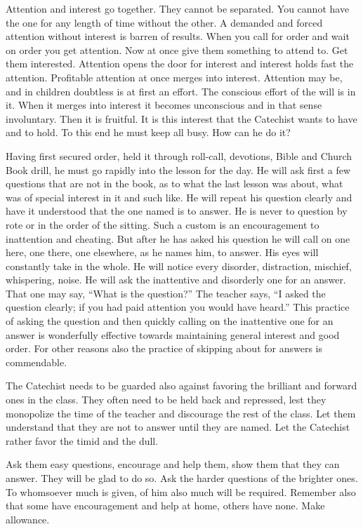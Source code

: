 Attention and interest go together. They cannot be separated. You cannot have the one for any length of time without the other. A demanded and forced attention without interest is barren of results. When you call for order and wait on order you get attention. Now at once give them something to attend to. Get them interested. Attention opens the door
for interest and interest holds fast the attention. Profitable attention at once merges into interest. Attention may be, and in children doubtless is at first an effort. The conscious effort of the will is in it. When it merges into interest it becomes unconscious and in that sense involuntary. Then it is fruitful. It is this interest that the Catechist wants to have and to hold. To this end he must keep all busy. How can he do it?

Having first secured order, held it through roll-call, devotions, Bible and Church Book drill, he must go rapidly into the lesson for the day. He will ask first a few questions that are not in the book, as to what the last lesson was about, what was of special interest in it and such like. He will repeat his question clearly and have it understood that the one named is to answer. He is never to question by rote or in the order of the sitting. Such a custom is an encouragement to inattention and cheating. But after he has asked his question he will call on one here, one there, one elsewhere, as he names him, to answer. His eyes will constantly take in the whole. He will notice every disorder, distraction, mischief, whispering, noise. He will ask the inattentive and disorderly one for an answer. That one may say, “What is the question?” The teacher says, “I asked the question clearly; if you had paid attention you would have heard.” This practice of asking the
question and then quickly calling on the inattentive one for an answer is wonderfully effective towards maintaining general interest and good order. For other reasons also the practice of skipping about for answers is commendable.

The Catechist needs to be guarded also against favoring the brilliant and forward ones in the class. They often need to be held back and repressed, lest they monopolize the time of the teacher and discourage the rest of the class. Let them understand that they are not to answer until they are named. Let the Catechist rather favor the timid and the dull.

Ask them easy questions, encourage and help them, show them that they can answer. They will be glad to do so. Ask the harder questions of the brighter ones. To whomsoever much is given, of him also much will be required. Remember also that some have encouragement and help at home, others have none. Make allowance.

